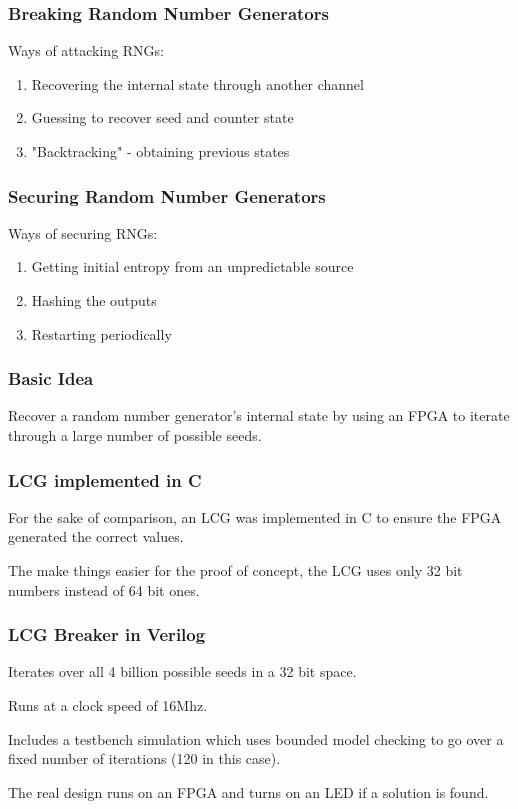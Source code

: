 \documentclass{beamer}
\begin{document}
  \begin{frame}
    \frametitle{Breaking Random Number Generators}

    Ways of attacking RNGs:
    \begin{enumerate}
        \item Recovering the internal state through another channel
        \item Guessing to recover seed and counter state
        \item "Backtracking" - obtaining previous states
    \end{enumerate}
    
  \end{frame}
  
  \begin{frame}
    \frametitle{Securing Random Number Generators}

    Ways of securing RNGs:
    \begin{enumerate}
        \item Getting initial entropy from an unpredictable source
        \item Hashing the outputs
        \item Restarting periodically
    \end{enumerate}
    
  \end{frame}


  \begin{frame}
    \frametitle{Basic Idea}

    Recover a random number generator's internal state
    by using an FPGA to iterate through a large number of possible seeds.
  \end{frame}

  \begin{frame}
    \frametitle{LCG implemented in C}

    For the sake of comparison, an LCG was implemented in C
    to ensure the FPGA generated the correct values.    

    \vfill

    The make things easier for the proof of concept,
    the LCG uses only 32 bit numbers instead of 64 bit ones.
  \end{frame}

  \begin{frame}
    \frametitle{LCG Breaker in Verilog}

    Iterates over all 4 billion possible seeds in a 32 bit space.

    Runs at a clock speed of 16Mhz.

    \vfill

    Includes a testbench simulation which uses bounded model
    checking to go over a fixed number of iterations (120 in this case).

    \vfill

    The real design runs on an FPGA and turns on an LED if
    a solution is found.

  \end{frame}
\end{document}
